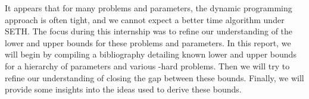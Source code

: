 It appears that for many problems and parameters, the dynamic programming approach is often tight, and we cannot expect a better time algorithm under SETH. The focus during this internship was to refine our understanding of the lower and upper bounds for these problems and parameters.
In this report, we will begin by compiling a bibliography detailing known lower and upper bounds for a hierarchy of parameters and various \NP-hard problems. Then we will try to refine our understanding of closing the gap between these bounds. Finally, we will provide some insights into the ideas used to derive these bounds.